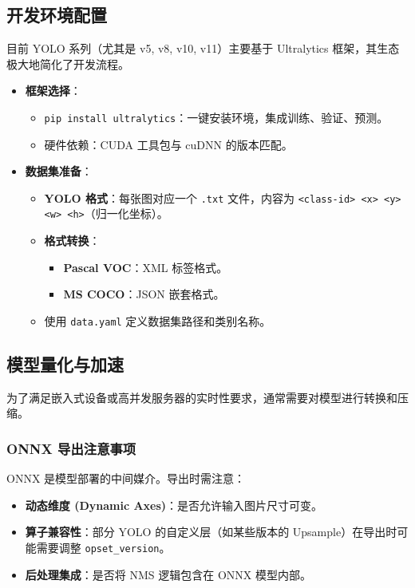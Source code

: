 \documentclass[11pt,a4paper]{article}
\begin{document}
\subsection{开发环境配置}
目前 YOLO 系列（尤其是 v5, v8, v10, v11）主要基于 Ultralytics 框架，其生态极大地简化了开发流程。
\begin{itemize}
    \item \textbf{框架选择}：
    \begin{itemize}
        \item \texttt{pip install ultralytics}：一键安装环境，集成训练、验证、预测。
        \item 硬件依赖：CUDA 工具包与 cuDNN 的版本匹配。
    \end{itemize}
    \item \textbf{数据集准备}：
    \begin{itemize}
        \item \textbf{YOLO 格式}：每张图对应一个 \texttt{.txt} 文件，内容为 \texttt{<class-id> <x> <y> <w> <h>}（归一化坐标）。
        \item \textbf{格式转换}：
            \begin{itemize}
                \item \textbf{Pascal VOC}：XML 标签格式。
                \item \textbf{MS COCO}：JSON 嵌套格式。
            \end{itemize}
        \item 使用 \texttt{data.yaml} 定义数据集路径和类别名称。
    \end{itemize}
\end{itemize}

\subsection{模型量化与加速}
为了满足嵌入式设备或高并发服务器的实时性要求，通常需要对模型进行转换和压缩。

\subsubsection{ONNX 导出注意事项}
ONNX 是模型部署的中间媒介。导出时需注意：
\begin{itemize}
    \item \textbf{动态维度 (Dynamic Axes)}：是否允许输入图片尺寸可变。
    \item \textbf{算子兼容性}：部分 YOLO 的自定义层（如某些版本的 Upsample）在导出时可能需要调整 \texttt{opset\_version}。
    \item \textbf{后处理集成}：是否将 NMS 逻辑包含在 ONNX 模型内部。
\end{itemize}
\end{document}
